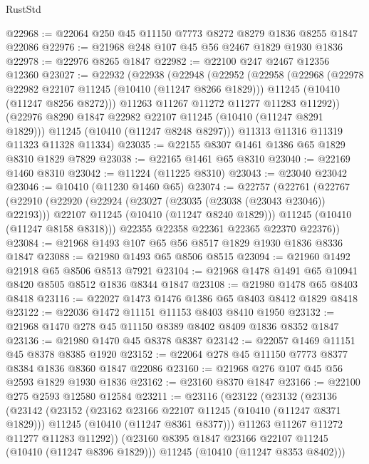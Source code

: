 \begin{lexlean}{RustStd}
\begin{coremodule}
@22968 := @22064 @250 @45 @11150 @7773 @8272 @8279 @1836 @8255 @1847 @22086
@22976 := @21968 @248 @107 @45 @56 @2467 @1829 @1930 @1836
@22978 := @22976 @8265 @1847
@22982 := @22100 @247 @2467 @12356 @12360
@23027 := @22932
    (@22938
      (@22948
        (@22952
          (@22958
            (@22968
              (@22978 @22982 @22107 @11245 (@10410 (@11247 @8266 @1829)))
              @11245
              (@10410 (@11247 @8256 @8272)))
            @11263
            @11267
            @11272
            @11277
            @11283
            @11292))
        (@22976 @8290 @1847 @22982 @22107 @11245 (@10410 (@11247 @8291 @1829)))
        @11245
        (@10410 (@11247 @8248 @8297)))
      @11313
      @11316
      @11319
      @11323
      @11328
      @11334)
@23035 := @22155 @8307 @1461 @1386 @65 @1829 @8310 @1829 @7829
@23038 := @22165 @1461 @65 @8310
@23040 := @22169 @1460 @8310
@23042 := @11224 (@11225 @8310)
@23043 := @23040 @23042
@23046 := @10410 (@11230 @1460 @65)
@23074 := @22757
    (@22761
      (@22767
        (@22910
          (@22920
            (@22924 (@23027 (@23035 (@23038 (@23043 @23046)) @22193)))
            @22107
            @11245
            (@10410 (@11247 @8240 @1829)))
          @11245
          (@10410 (@11247 @8158 @8318)))
        @22355
        @22358
        @22361
        @22365
        @22370
        @22376))
@23084 := @21968 @1493 @107 @65 @56 @8517 @1829 @1930 @1836 @8336 @1847
@23088 := @21980 @1493 @65 @8506 @8515
@23094 := @21960 @1492 @21918 @65 @8506 @8513 @7921
@23104 := @21968 @1478 @1491 @65 @10941 @8420 @8505 @8512 @1836 @8344 @1847
@23108 := @21980 @1478 @65 @8403 @8418
@23116 := @22027 @1473 @1476 @1386 @65 @8403 @8412 @1829 @8418
@23122 := @22036 @1472 @11151 @11153 @8403 @8410 @1950
@23132 := @21968 @1470 @278 @45 @11150 @8389 @8402 @8409 @1836 @8352 @1847
@23136 := @21980 @1470 @45 @8378 @8387
@23142 := @22057 @1469 @11151 @45 @8378 @8385 @1920
@23152 := @22064 @278 @45 @11150 @7773 @8377 @8384 @1836 @8360 @1847 @22086
@23160 := @21968 @276 @107 @45 @56 @2593 @1829 @1930 @1836
@23162 := @23160 @8370 @1847
@23166 := @22100 @275 @2593 @12580 @12584
@23211 := @23116
    (@23122
      (@23132
        (@23136
          (@23142
            (@23152
              (@23162 @23166 @22107 @11245 (@10410 (@11247 @8371 @1829)))
              @11245
              (@10410 (@11247 @8361 @8377)))
            @11263
            @11267
            @11272
            @11277
            @11283
            @11292))
        (@23160 @8395 @1847 @23166 @22107 @11245 (@10410 (@11247 @8396 @1829)))
        @11245
        (@10410 (@11247 @8353 @8402)))

\end{coremodule}
\end{lexlean}

